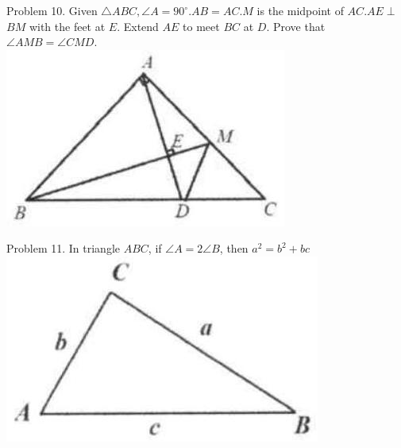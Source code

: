 \documentclass[10pt]{article}
\begin{document}
Problem 10. Given \(\triangle A B C, \angle A=90^{\circ} . A B=A C . M\) is the midpoint of \(A C . A E \perp\) \(B M\) with the feet at \(E\). Extend \(A E\) to meet \(B C\) at \(D\). Prove that \(\angle A M B=\angle C M D\).\\
\includegraphics[max width=\textwidth, center]{2025_04_17_97bc1f7e44d93c271a88g-066(2)}

Problem 11. In triangle \(A B C\), if \(\angle A=2 \angle B\), then \(a^{2}=b^{2}+b c\)\\
\includegraphics[max width=\textwidth, center]{2025_04_17_97bc1f7e44d93c271a88g-066(1)}
\end{document}
